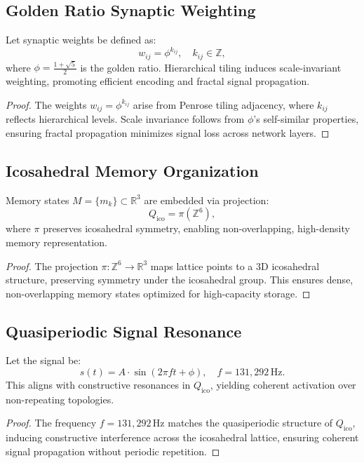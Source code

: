 \documentclass[12pt]{article}
\begin{document}
\subsection{Golden Ratio Synaptic Weighting}
\begin{theorem}
Let synaptic weights be defined as:
\[
w_{ij} = \phi^{k_{ij}}, \quad k_{ij} \in \mathbb{Z},
\]
where \( \phi = \frac{1 + \sqrt{5}}{2} \) is the golden ratio. Hierarchical tiling induces scale-invariant weighting, promoting efficient encoding and fractal signal propagation.
\end{theorem}
\begin{proof}
The weights \( w_{ij} = \phi^{k_{ij}} \) arise from Penrose tiling adjacency, where \( k_{ij} \) reflects hierarchical levels. Scale invariance follows from \( \phi \)'s self-similar properties, ensuring fractal propagation minimizes signal loss across network layers.
\end{proof}

\subsection{Icosahedral Memory Organization}
\begin{theorem}
Memory states \( M = \{ m_k \} \subset \mathbb{R}^3 \) are embedded via projection:
\[
Q_{\text{ico}} = \pi(\mathbb{Z}^6),
\]
where \( \pi \) preserves icosahedral symmetry, enabling non-overlapping, high-density memory representation.
\end{theorem}
\begin{proof}
The projection \( \pi: \mathbb{Z}^6 \to \mathbb{R}^3 \) maps lattice points to a 3D icosahedral structure, preserving symmetry under the icosahedral group. This ensures dense, non-overlapping memory states optimized for high-capacity storage.
\end{proof}

\subsection{Quasiperiodic Signal Resonance}
\begin{lemma}
Let the signal be:
\[
s(t) = A \cdot \sin(2\pi f t + \phi), \quad f = 131{,}292 \, \text{Hz}.
\]
This aligns with constructive resonances in \( Q_{\text{ico}} \), yielding coherent activation over non-repeating topologies.
\end{lemma}
\begin{proof}
The frequency \( f = 131{,}292 \, \text{Hz} \) matches the quasiperiodic structure of \( Q_{\text{ico}} \), inducing constructive interference across the icosahedral lattice, ensuring coherent signal propagation without periodic repetition.
\end{proof}
\end{document}
